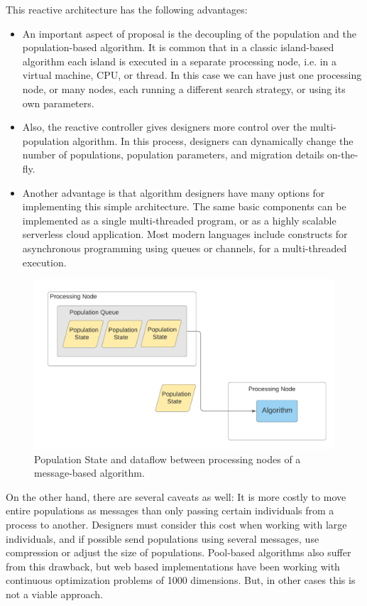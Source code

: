 \documentclass[review]{elsarticle}
\begin{document}
This reactive architecture has the following advantages:\begin{itemize}
\item 
An important aspect of proposal is the decoupling of the population and 
the population-based algorithm. It is common that in a classic island-based algorithm
each island is executed in a separate processing node, i.e. in a virtual machine, CPU,
or thread. In this case we can have just one processing node, or many nodes, each 
running a different search strategy, or using its own parameters. 
\item 
Also, the reactive controller gives designers more control over the multi-population algorithm.
In this process, designers can dynamically change the number of populations, population parameters,
and migration details on-the-fly.
\item 
Another advantage is that algorithm designers have many options for implementing this simple architecture. 
The same basic components can be implemented as a single multi-threaded program, or 
as a highly scalable serverless cloud application. Most modern languages include 
constructs for asynchronous programming using queues or channels, for a multi-threaded
execution.
\end{itemize}

\begin{figure}[ht]
    \centering
    \includegraphics[width=\textwidth]{population_message}
    \caption{Population State and dataflow between processing nodes of a message-based algorithm.}
    \label{fig:population_message}
\end{figure}

On the other hand, there are several caveats as well:
It is more costly to move entire populations as messages than only passing certain individuals 
from a process to another. Designers must consider this cost when working with large
individuals, and if possible send populations using several messages, use compression or 
adjust the size of populations. Pool-based algorithms also suffer from this drawback, but 
web based implementations have been working with continuous optimization problems of 1000 dimensions.
But, in other cases this is not a viable approach. 
\end{document}
